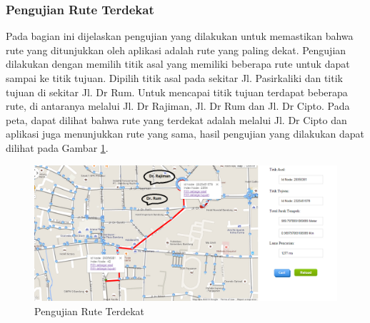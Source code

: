 \setcounter{secnumdepth}{3}
\setcounter{tocdepth}{3}
\subsubsection{Pengujian Rute Terdekat}
Pada bagian ini dijelaskan pengujian yang dilakukan untuk memastikan bahwa rute
yang ditunjukkan oleh aplikasi adalah rute yang paling dekat. Pengujian
dilakukan dengan memilih titik asal yang memiliki beberapa rute untuk dapat
sampai ke titik tujuan. Dipilih titik asal pada sekitar Jl. Pasirkaliki dan
titik tujuan di sekitar Jl. Dr Rum. Untuk mencapai titik tujuan terdapat
beberapa rute, di antaranya melalui Jl. Dr Rajiman, Jl. Dr Rum dan Jl. Dr Cipto.
Pada peta, dapat dilihat bahwa rute yang terdekat adalah melalui Jl. Dr Cipto dan aplikasi
juga menunjukkan rute yang sama, hasil pengujian yang dilakukan dapat dilihat
pada Gambar \ref{fig:pu_terdekat}.
\begin{figure}[h]
\centering
\includegraphics[scale=0.45]{Gambar/pu_terdekat}
\caption[Pengujian Rute Terdekat]{Pengujian Rute Terdekat}
\label{fig:pu_terdekat}
\end{figure}


